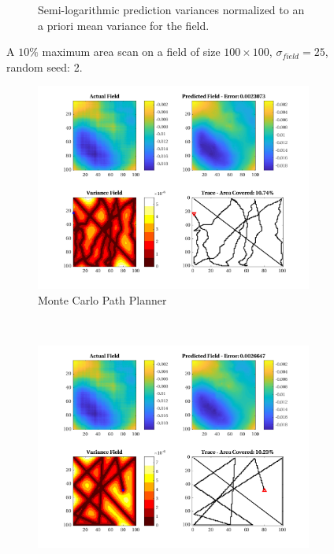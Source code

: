 \begin{figure}[htb!]
\begin{subfigure}[t]{0.65\textwidth}
        \captionsetup{skip=0.20\baselineskip,size=footnotesize}
        \caption{Semi-logarithmic prediction variances normalized to an a priori mean variance for the field.}
        \label{fig:prederrs_sigma25_p10_s2}
    \end{subfigure}
    \captionsetup{skip=0.20\baselineskip}
    \caption{A $10\%$ maximum area scan on a field of size $100 \times 100$, $\sigma_{field} = 25$, random seed: 2.}
    \label{fig:sigma25_p10_s2}
\end{figure}

\begin{figure}[htb!]
    \centering
    \begin{subfigure}[t]{0.5\textwidth}
        \centering
        \includegraphics[width=\linewidth]{figures/hbresults/mc_10p_100x100_sf_25_seed_2.png}
        \captionsetup{skip=0.10\baselineskip,size=footnotesize}
        \caption{Monte Carlo Path Planner}
    \end{subfigure}%
    ~ 
    \begin{subfigure}[t]{0.5\textwidth}
        \centering
        \includegraphics[width=\linewidth]{figures/hbresults/nhv_10p_100x100_sf_25_seed_2.png}

\end{subfigure}
\end{figure}
